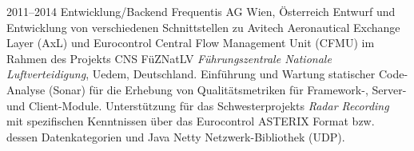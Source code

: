 \cventry
{2011--2014}
{Entwicklung/Backend}
{}
{Frequentis AG}
{Wien, Österreich}
{
  Entwurf und Entwicklung von verschiedenen Schnittstellen zu Avitech Aeronautical
  Exchange Layer (AxL) und Eurocontrol Central Flow Management Unit (CFMU)
  im Rahmen des Projekts CNS FüZNatLV \emph{Führungszentrale Nationale Luftverteidigung},
  Uedem, Deutschland.
  Einführung und Wartung statischer Code-Analyse (Sonar) für die Erhebung von
  Qualitätsmetriken für Framework-, Server- und Client-Module.
  Unterstützung für das Schwesterprojekts \emph{Radar Recording} mit spezifischen Kenntnissen
  über das Eurocontrol ASTERIX Format bzw. dessen Datenkategorien und Java Netty
  Netzwerk-Bibliothek (UDP).
}
